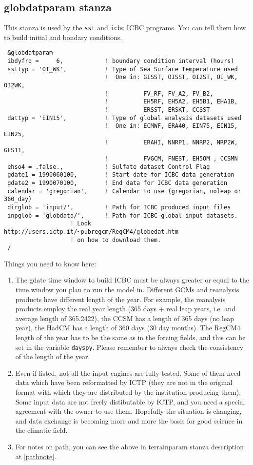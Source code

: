 \subsection{globdatparam stanza}

This stanza is used by the \verb=sst= and \verb=icbc= ICBC programs. You can
tell them how to build initial and bondary conditions.

{\footnotesize
\begin{Verbatim}
 &globdatparam
 ibdyfrq =     6,            ! boundary condition interval (hours)
 ssttyp = 'OI_WK',           ! Type of Sea Surface Temperature used
                             !  One in: GISST, OISST, OI2ST, OI_WK, OI2WK,
                             !          FV_RF, FV_A2, FV_B2,
                             !          EH5RF, EH5A2, EH5B1, EHA1B,
                             !          ERSST, ERSKT, CCSST
 dattyp = 'EIN15',           ! Type of global analysis datasets used
                             !  One in: ECMWF, ERA40, EIN75, EIN15, EIN25,
                             !          ERAHI, NNRP1, NNRP2, NRP2W, GFS11,
                             !          FVGCM, FNEST, EH5OM , CCSMN
 ehso4 = .false.,            ! Sulfate dataset Control Flag
 gdate1 = 1990060100,        ! Start date for ICBC data generation
 gdate2 = 1990070100,        ! End data for ICBC data generation
 calendar = 'gregorian',     ! Calendar to use (gregorian, noleap or 360_day)
 dirglob = 'input/',         ! Path for ICBC produced input files
 inpglob = 'globdata/',      ! Path for ICBC global input datasets.
                   ! Look http://users.ictp.it/~pubregcm/RegCM4/globedat.htm
                   ! on how to download them.
 /
\end{Verbatim}
}

Things you need to know here:

\begin{enumerate}
\item The gdate time window to build ICBC must be always greater or equal to
the time window you plan to run the model in.
Different GCMs and reanalysis products have different length of the year.
For example, the reanalysis products employ the real year length (365 days +
real leap years, i.e. and average length of 365.2422), the CCSM has a length
of 365 days (no leap year), the HadCM has a length of 360 days (30 day months).
The RegCM4 length of the year has to be the same as in the forcing fields, and
this can be set in the variable \verb=dayspy=.
Please remember to always check the consistency of the length of the year.
\item Even if listed, not all the input engines are fully tested. Some of them
need data which have been reformatted by ICTP (they are not in the original
format with which they are distributed by the institution producing them).
Some input data are not freely distibutable by ICTP, and you need a special
agreement with the owner to use them.
Hopefully the situation is changing, and data exchange is becoming more and more
the basis for good science in the climatic field.
\item For notes on path, you can see the above in terrainparam stanza
description at \ref{pathnote}.
\end{enumerate}

